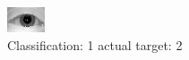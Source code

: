 \begin{figure}[h!]
\begin{center}
\includegraphics[width=0.60\columnwidth]{figures/ID1023_class_1_target_2.png}
\end{center}
\caption{ Classification: 1 actual target: 2}
\label{fig:ID1023_class_1_target_2}
\end{figure}
